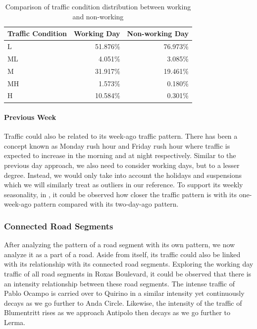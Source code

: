 \begin{table}[t]

\centering
\caption{Comparison of traffic condition distribution between working and non-working}
\label{table_traffic_cond_workingday}

\begin{tabular}{|l|r|r|}
\hline
\textbf{Traffic Condition} & \textbf{Working Day} & \textbf{Non-working Day} \\ \hline
L                          & 51.876\%             & 76.973\%                 \\ \hline
ML                         & 4.051\%              & 3.085\%                  \\ \hline
M                          & 31.917\%             & 19.461\%                 \\ \hline
MH                         & 1.573\%              & 0.180\%                  \\ \hline
H                          & 10.584\%             & 0.301\%                  \\ \hline
\end{tabular}
\end{table}


\paragraph{Previous Week}

Traffic could also be related to its week-ago traffic pattern. There has been a concept known as Monday rush hour and Friday rush hour where traffic is expected to increase in the morning and at night respectively. Similar to the previous day approach, we also need to consider working days, but to a lesser degree. Instead, we would only take into account the holidays and suspensions which we will similarly treat as outliers in our reference. To support its weekly seasonality, in , it could be observed how closer the traffic pattern is with its one-week-ago pattern compared with its two-day-ago pattern.



\subsubsection{Connected Road Segments}

After analyzing the pattern of a road segment with its own pattern, we now analyze it as a part of a road. Aside from itself, its traffic could also be linked with its relationship with its connected road segments. Exploring the working day traffic of all road segments in Roxas Boulevard, it could be observed that there is an intensity relationship between these road segments. The intense traffic of Pablo Ocampo is carried over to Quirino in a similar intensity yet continuously decays as we go further to Anda Circle. Likewise, the intensity of the traffic of Blumentritt rises as we approach Antipolo then decays as we go further to Lerma.


